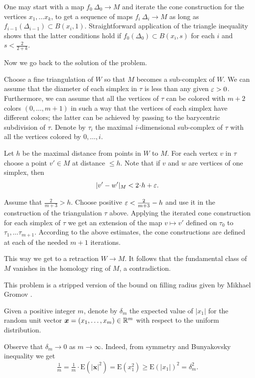 One may start with a map $f_0\:\Delta_0\to M$ and iterate the cone construction for the vertices $x_1,\dots x_k$,
to get a sequence of maps $f_i\:\Delta_i\to M$
as long as $f_{i-1}(\Delta_{i-1})\subset B(x_i,1)$.
Straightforward application of the triangle inequality 
shows that the latter conditions hold if 
$f_0(\Delta_0)\subset B(x_i,s)$ for each $i$ and $s<\tfrac2{2+k}$.

\medskip

Now we go back to the solution of the problem.

Choose a fine triangulation of $W$ so that $M$ becomes a sub-complex of $W$.
We can assume that the diameter of each simplex in $\tau$ is less than any given
$\varepsilon>0$.
Furthermore, we can assume that all the vertices of $\tau$ can be colored with $m+2$ colors $(0,\dots, m+1)$
in such a way that the vertices of each simplex 
have different colors;
the latter can be achieved by passing to the barycentric subdivision of $\tau$.
Denote by $\tau_i$ the maximal $i$-dimensional sub-complex of $\tau$ 
with all the vertices colored by $0,\dots, i$.

Let $h$ be the maximal distance from points in $W$ to $M$.
For each vertex $v$ in $\tau$ 
choose a point $v'\in M$ at distance $\le h$.
Note that 
if $v$ and $w$ are vertices of one simplex,
then
\[|v'-w'|_M<2\cdot h+\eps.\]

Assume that $\tfrac{2}{m+3}>h$.
Choose positive $\varepsilon<\tfrac{2}{m+3}-h$ and use it in the construction of the triangulation $\tau$ above.
Applying the iterated cone construction for each simplex of $\tau$
we get an extension of the map $v\mapsto v'$ defined on $\tau_0$ to $\tau_1,\dots\tau_{m+1}$.
According to the above estimates, the cone constructions are defined at each of the needed $m+1$ iterations.

This way we get 
to a retraction $W\to M$.
It follows that the fundamental class of $M$ vanishes in the homology ring of $M$, 
a contradiction. 
\qeds


This problem is a stripped version of the bound on filling radius given by Mikhael Gromov \cite{gromov-filling}.  

Given a positive integer $m$,
denote by $\delta_m$ 
the expected value of $|x_1|$ for the random unit vector 
$\bm{x}\z=(x_1,\dots,x_m)\z\in\RR^m$ 
with respect to the uniform distribution.

Observe that $\delta_m\to 0$ as $m\to\infty$.
Indeed, from symmetry and Bunyakovsky inequality we get
\[
\tfrac1m=\tfrac1m\cdot\mathrm{E}(|\bm{x}|^2)
=\mathrm{E}(x_1^2)\ge \mathrm{E}(|x_1|)^2=\delta_m^2.
\]

